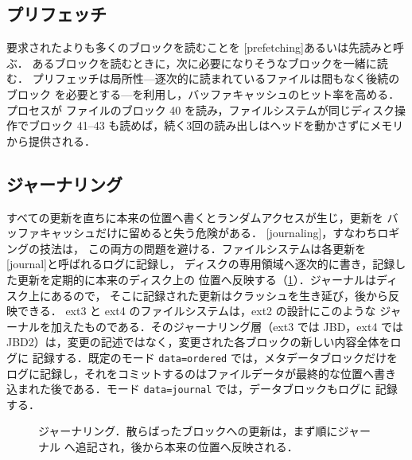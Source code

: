 \documentclass[../main.tex]{subfiles}
\begin{document}
\subsection{プリフェッチ}

要求されたよりも多くのブロックを読むことを
[prefetching]あるいは先読みと呼ぶ．
あるブロックを読むときに，次に必要になりそうなブロックを一緒に読む．
プリフェッチは局所性---逐次的に読まれているファイルは間もなく後続のブロック
を必要とする---を利用し，バッファキャッシュのヒット率を高める．プロセスが
ファイルのブロック 40 を読み，ファイルシステムが同じディスク操作でブロック
41--43 も読めば，続く3回の読み出しはヘッドを動かさずにメモリから提供される．%

\subsection{ジャーナリング}

すべての更新を直ちに本来の位置へ書くとランダムアクセスが生じ，更新を
バッファキャッシュだけに留めると失う危険がある．
[journaling]，すなわちロギングの技法は，
この両方の問題を避ける．ファイルシステムは各更新を
[journal]と呼ばれるログに記録し，
ディスクの専用領域へ逐次的に書き，記録した更新を定期的に本来のディスク上の
位置へ反映する（\cref{fig:l11-journal}）．ジャーナルはディスク上にあるので，
そこに記録された更新はクラッシュを生き延び，後から反映できる．%
%
ext3 と ext4 のファイルシステムは，ext2 の設計にこのような
ジャーナルを加えたものである．そのジャーナリング層（ext3 では JBD，ext4 では
JBD2）は，変更の記述ではなく，変更された各ブロックの新しい内容全体をログに
記録する．既定のモード \texttt{data=ordered} では，メタデータブロックだけを
ログに記録し，それをコミットするのはファイルデータが最終的な位置へ書き
込まれた後である．モード \texttt{data=journal} では，データブロックもログに
記録する．


\begin{figure}[htbp]
  \centering
  
  \caption{ジャーナリング．散らばったブロックへの更新は，まず順にジャーナル
    へ追記され，後から本来の位置へ反映される．}
  \label{fig:l11-journal}
\end{figure}
\end{document}
